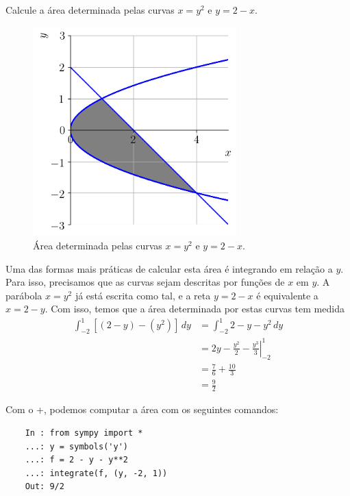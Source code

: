 \begin{ex}
  Calcule a área determinada pelas curvas $x = y^2$ e $y = 2 - x$.

  \begin{figure}[H]
    \centering
    \includegraphics[width=0.7\textwidth]{./cap_apint/dados/fig_ex_apint_areacurvasy/fig}
    \caption{Área determinada pelas curvas $x = y^2$ e $y = 2 - x$.}
    \label{fig:ex_apint_areacurvasy}
  \end{figure}

  Uma das formas mais práticas de calcular esta área é integrando em relação a $y$. Para isso, precisamos que as curvas sejam descritas por funções de $x$ em $y$. A parábola $x = y^2$ já está escrita como tal, e a reta $y = 2 - x$ é equivalente a $x = 2 - y$. Com isso, temos que a área determinada por estas curvas tem medida
  \begin{align}
    \int_{-2}^1 \left[(2-y) - (y^2)\right]\,dy &= \int_{-2}^1 2-y-y^2\,dy\\
                                               &= \left. 2y-\frac{y^2}{2}-\frac{y^3}{3}\right|_{-2}^1\\
                                               &= \frac{7}{6} + \frac{10}{3}\\
                                               &=\frac{9}{2}
  \end{align}
  
  \ifispython
  Com o {\python}+{\sympy}, podemos computar a área com os seguintes comandos:
  \begin{lstlisting}
    In : from sympy import *
    ...: y = symbols('y')
    ...: f = 2 - y - y**2
    ...: integrate(f, (y, -2, 1))
    Out: 9/2
  \end{lstlisting}
  \fi  
\end{ex}

